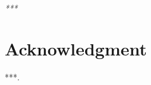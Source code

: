 \thispagestyle{empty}

\begin{flushright}
    \emph{\scriptsize{
            ***}}
\end{flushright}

\clearpage
\thispagestyle{empty}
\clearpage

\chapter*{Acknowledgment}
\thispagestyle{empty}
***.

\clearpage
\thispagestyle{empty}
\null\newpage
\clearpage
